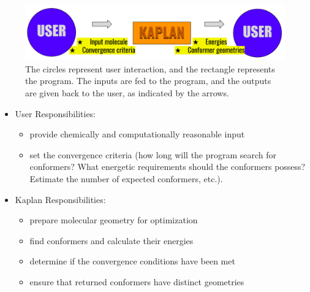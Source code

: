 \documentclass[12pt]{article}
\newcommand{\progname}{Kaplan} %
\begin{document}


\begin{figure}[H]
	\includegraphics[width=\textwidth]{sys-context}
	\caption{The circles represent user interaction, and the rectangle 
	represents the program. The inputs are fed to the program, and the 
	outputs are given back to the user, as indicated by the arrows.}
	\label{sys-context}
\end{figure}

\begin{itemize}
\item User Responsibilities:
\begin{itemize}
\item provide chemically and computationally reasonable input

\item set the convergence criteria (how long will the program search for 
conformers? What energetic requirements should the 
conformers possess? Estimate 
the number of expected conformers, etc.).
\end{itemize}
\item \progname{} Responsibilities:
\begin{itemize}
\item prepare molecular geometry for optimization
\item find conformers and calculate their energies
\item determine if the convergence conditions have been met
\item ensure that returned conformers have distinct geometries 
\end{itemize}
\end{itemize}
\end{document}
